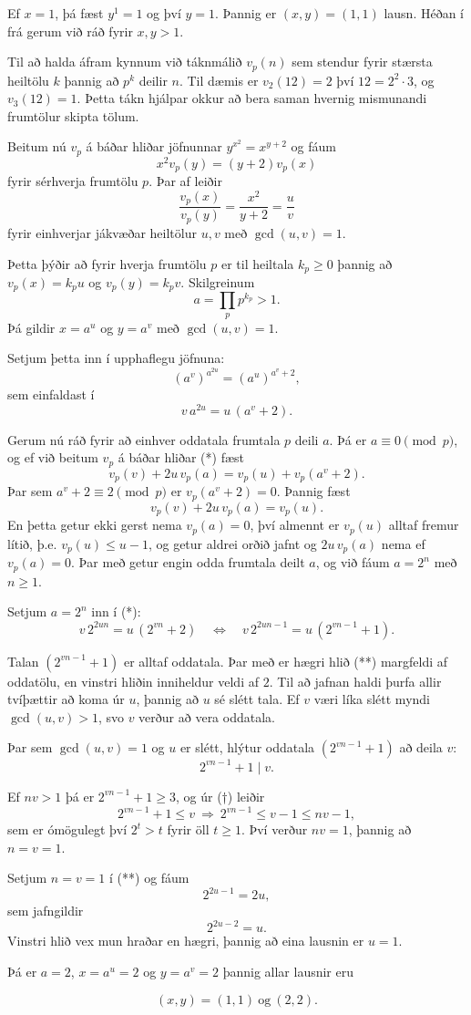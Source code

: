 Ef $x = 1$, þá fæst $y^{1} = 1$ og því $y = 1$.  
Þannig er $(x,y) = (1,1)$ lausn.  
Héðan í frá gerum við ráð fyrir $x, y > 1$.

Til að halda áfram kynnum við táknmálið $v_p(n)$ sem stendur fyrir stærsta heiltölu $k$ þannig að $p^k$ deilir $n$.  
Til dæmis er $v_2(12) = 2$ því $12 = 2^2 \cdot 3$, og $v_3(12) = 1$.  
Þetta tákn hjálpar okkur að bera saman hvernig mismunandi frumtölur skipta tölum.

Beitum nú $v_p$ á báðar hliðar jöfnunnar $y^{x^2} = x^{y+2}$ og fáum
\[
x^2 v_p(y) = (y + 2) v_p(x)
\]
fyrir sérhverja frumtölu $p$.  
Þar af leiðir
\[
\frac{v_p(x)}{v_p(y)} = \frac{x^2}{y + 2} = \frac{u}{v}
\]
fyrir einhverjar jákvæðar heiltölur $u, v$ með $\gcd(u,v) = 1$.

Þetta þýðir að fyrir hverja frumtölu $p$ er til heiltala $k_p \ge 0$ þannig að  
$v_p(x) = k_p u$ og $v_p(y) = k_p v$.  
Skilgreinum
\[
a = \prod_p p^{k_p} > 1.
\]
Þá gildir $x = a^u$ og $y = a^v$ með $\gcd(u,v) = 1$.

Setjum þetta inn í upphaflegu jöfnuna:
\[
(a^v)^{a^{2u}} = (a^u)^{a^v + 2},
\]
sem einfaldast í
\[
v\,a^{2u} = u\,(a^v + 2). \tag{*}
\]

Gerum nú ráð fyrir að einhver oddatala frumtala $p$ deili $a$.  
Þá er $a \equiv 0 \pmod p$, og ef við beitum $v_p$ á báðar hliðar (*) fæst
\[
v_p(v) + 2u\,v_p(a) = v_p(u) + v_p(a^v + 2).
\]
Þar sem $a^v + 2 \equiv 2 \pmod p$ er $v_p(a^v + 2) = 0$.  
Þannig fæst
\[
v_p(v) + 2u\,v_p(a) = v_p(u).
\]
En þetta getur ekki gerst nema $v_p(a) = 0$, því almennt er $v_p(u)$ alltaf fremur lítið,  
þ.e. $v_p(u) \le u-1$, og getur aldrei orðið jafnt og $2u\,v_p(a)$ nema ef $v_p(a) = 0$.  
Þar með getur engin odda frumtala deilt $a$, og við fáum $a = 2^n$ með $n \ge 1$.

Setjum $a = 2^n$ inn í (*):
\[
v\,2^{2un} = u\,(2^{vn} + 2)
\quad\Longleftrightarrow\quad
v\,2^{2un - 1} = u\,(2^{vn - 1} + 1). \tag{**}
\]

Talan $(2^{vn - 1} + 1)$ er alltaf oddatala.  
Þar með er hægri hlið (**) margfeldi af oddatölu, en vinstri hliðin inniheldur veldi af $2$.  
Til að jafnan haldi þurfa allir tvíþættir að koma úr $u$, þannig að $u$ sé slétt tala.  
Ef $v$ væri líka slétt myndi $\gcd(u,v) > 1$, svo $v$ verður að vera oddatala.

Þar sem $\gcd(u,v) = 1$ og $u$ er slétt, hlýtur oddatala $(2^{vn - 1} + 1)$ að deila $v$:
\[
2^{vn - 1} + 1 \mid v. \tag{†}
\]

Ef $nv > 1$ þá er $2^{vn - 1} + 1 \ge 3$, og úr (†) leiðir
\[
2^{vn - 1} + 1 \le v \ \Rightarrow\ 2^{vn - 1} \le v - 1 \le nv - 1,
\]
sem er ómögulegt því $2^t > t$ fyrir öll $t \ge 1$.  
Því verður $nv = 1$, þannig að $n = v = 1$.

Setjum $n = v = 1$ í (**) og fáum
\[
2^{2u - 1} = 2u,
\]
sem jafngildir
\[
2^{2u - 2} = u.
\]
Vinstri hlið vex mun hraðar en hægri, þannig að eina lausnin er $u = 1$.

Þá er $a = 2$, $x = a^u = 2$ og $y = a^v = 2$ þannig allar lausnir eru

\[
(x,y) = (1,1)\ \text{og}\ (2,2).
\]